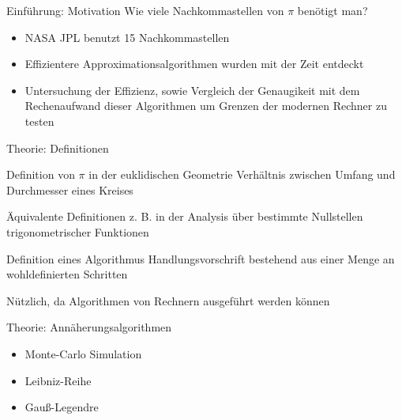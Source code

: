 \documentclass{beamer}
\begin{document}
\begin{frame}{Einführung: Motivation}
Wie viele Nachkommastellen von \(\pi\) benötigt man?
    \begin{itemize}
        \item<2-> NASA JPL benutzt 15 Nachkommastellen \cite{NASA}                                                                                         
    \end{itemize}
 \begin{itemize}
    \item<4-> Effizientere Approximationsalgorithmen wurden mit der Zeit entdeckt
    \item<5-> Untersuchung der Effizienz, sowie Vergleich der Genaugikeit mit dem Rechenaufwand dieser Algorithmen 
              um Grenzen der modernen Rechner zu testen
\end{itemize}
\end{frame}



\begin{frame}{Theorie: Definitionen}
    \begin{block}{Definition von \(\pi\) in der euklidischen Geometrie}
        Verhältnis zwischen Umfang und Durchmesser eines Kreises
    \end{block}
    Äquivalente Definitionen z. B. in der Analysis über bestimmte Nullstellen trigonometrischer Funktionen                                            %
    \\[10pt]
 {
    \begin{block}{Definition eines Algorithmus}
        Handlungsvorschrift bestehend aus einer Menge an wohldefinierten Schritten                                                                                             %
    \end{block}
     Nützlich, da Algorithmen von Rechnern ausgeführt werden können}
\end{frame}


\begin{frame}{Theorie: Annäherungsalgorithmen}
    \begin{itemize}
        \item Monte-Carlo Simulation
        \item Leibniz-Reihe
        \item Gauß-Legendre
    \end{itemize}
\end{frame}
\end{document}

